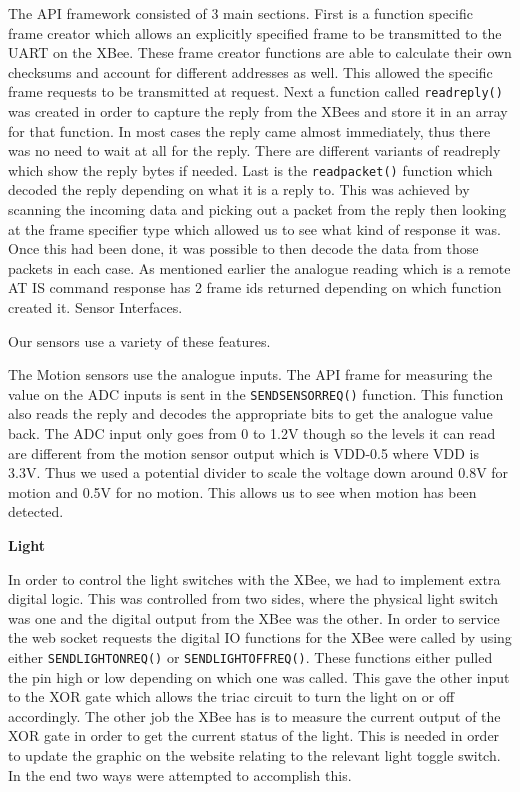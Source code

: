 \documentclass[10.5pt,a4paper,twoside]{report}   %
\begin{document}
The API framework consisted of 3 main sections. First is a function specific frame creator which allows an explicitly specified frame to be transmitted to the UART on the XBee. These frame creator functions are able to calculate their own checksums and account for different addresses as well. This allowed the specific frame requests to be transmitted at request. Next a function called \verb+readreply()+ was created in order to capture the reply from the XBees and store it in an array for that function. In most cases the reply came almost immediately, thus there was no need to wait at all for the reply. There are different variants of readreply which show the reply bytes if needed. Last is the \verb+readpacket()+ function which decoded the reply depending on what it is a reply to. This was achieved by scanning the incoming data and picking out a packet from the reply then looking at the frame specifier type which allowed us to see what kind of response it was. Once this had been done, it was possible to then decode the data from those packets in each case. As mentioned earlier the analogue reading which is a remote AT IS command response has 2 frame ids returned depending on which function created it.
Sensor Interfaces.

Our sensors use a variety of these features. 

The Motion sensors use the analogue inputs. The API frame for measuring the value on the ADC inputs is sent in the \verb+SENDSENSORREQ()+ function. This function also reads the reply and decodes the appropriate bits to get the analogue value back. The ADC input only goes from 0 to 1.2V though so the levels it can read are different from the motion sensor output which is VDD-0.5 where VDD is 3.3V. Thus we used a potential divider to scale the voltage down around 0.8V for motion and 0.5V for no motion. This allows us to see when motion has been detected.

\textbf{Light}

In order to control the light switches with the XBee, we had to implement extra digital logic. This was controlled from two sides, where the physical light switch was one and the digital output from the XBee was the other. In order to service the web socket requests the digital IO functions for the XBee were called by using either \verb+SENDLIGHTONREQ()+ or \verb+SENDLIGHTOFFREQ()+. These functions either pulled the pin high or low depending on which one was called. This gave the other input to the XOR gate which allows the triac circuit to turn the light on or off accordingly. The other job the XBee has is to measure the current output of the XOR gate in order to get the current status of the light. This is needed in order to update the graphic on the website relating to the relevant light toggle switch. In the end two ways were attempted to accomplish this. 
\end{document}
